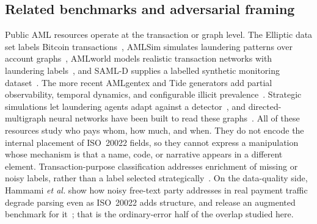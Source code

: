 \documentclass[conference]{IEEEtran}
\begin{document}
\subsection{Related benchmarks and adversarial framing}
Public AML resources operate at the transaction or graph level. The Elliptic
data set labels Bitcoin transactions~\cite{weber2019}, AMLSim simulates
laundering patterns over account graphs~\cite{suzumura2021}, AMLworld models
realistic transaction networks with laundering labels~\cite{altman2023}, and
SAML-D supplies a labelled synthetic monitoring dataset~\cite{oztas2023}.
The more recent AMLgentex and Tide generators add partial observability,
temporal dynamics, and configurable illicit prevalence~\cite{ostman2025,
beukel2026}. Strategic simulations let laundering agents adapt against a
detector~\cite{wang2025}, and directed-multigraph neural networks have been
built to read these graphs~\cite{egressy2024}. All of these resources study
who pays whom, how much, and when. They do not encode the internal placement
of ISO~20022 fields, so they cannot express a manipulation whose mechanism is
that a name, code, or narrative appears in a different element.
Transaction-purpose classification addresses enrichment of missing or noisy
labels, rather than a label selected strategically~\cite{busson2023}. On the
data-quality side, Hammami \emph{et al.} show how noisy free-text party
addresses in real payment traffic degrade parsing even as ISO~20022 adds
structure, and release an augmented benchmark for it~\cite{hammami2024}; that
is the ordinary-error half of the overlap studied here.
\end{document}
